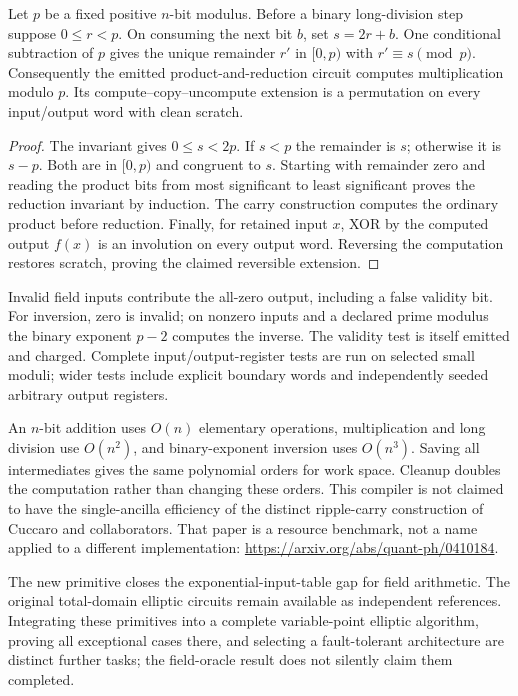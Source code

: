 \begin{proposition}
Let $p$ be a fixed positive $n$-bit modulus. Before a binary long-division step suppose $0\le r<p$. On consuming the next bit $b$, set $s=2r+b$. One conditional subtraction of $p$ gives the unique remainder $r'$ in $[0,p)$ with $r'\equiv s\pmod p$. Consequently the emitted product-and-reduction circuit computes multiplication modulo $p$. Its compute--copy--uncompute extension is a permutation on every input/output word with clean scratch.
\end{proposition}
\begin{proof}
The invariant gives $0\le s<2p$. If $s<p$ the remainder is $s$; otherwise it is $s-p$. Both are in $[0,p)$ and congruent to $s$. Starting with remainder zero and reading the product bits from most significant to least significant proves the reduction invariant by induction. The carry construction computes the ordinary product before reduction. Finally, for retained input $x$, XOR by the computed output $f(x)$ is an involution on every output word. Reversing the computation restores scratch, proving the claimed reversible extension.
\end{proof}

Invalid field inputs contribute the all-zero output, including a false validity bit. For inversion, zero is invalid; on nonzero inputs and a declared prime modulus the binary exponent $p-2$ computes the inverse. The validity test is itself emitted and charged. Complete input/output-register tests are run on selected small moduli; wider tests include explicit boundary words and independently seeded arbitrary output registers.

An $n$-bit addition uses $O(n)$ elementary operations, multiplication and long division use $O(n^2)$, and binary-exponent inversion uses $O(n^3)$. Saving all intermediates gives the same polynomial orders for work space. Cleanup doubles the computation rather than changing these orders. This compiler is not claimed to have the single-ancilla efficiency of the distinct ripple-carry construction of Cuccaro and collaborators. That paper is a resource benchmark, not a name applied to a different implementation: \url{https://arxiv.org/abs/quant-ph/0410184}.

\begin{center}\small\end{center}

The new primitive closes the exponential-input-table gap for field arithmetic. The original total-domain elliptic circuits remain available as independent references. Integrating these primitives into a complete variable-point elliptic algorithm, proving all exceptional cases there, and selecting a fault-tolerant architecture are distinct further tasks; the field-oracle result does not silently claim them completed.

